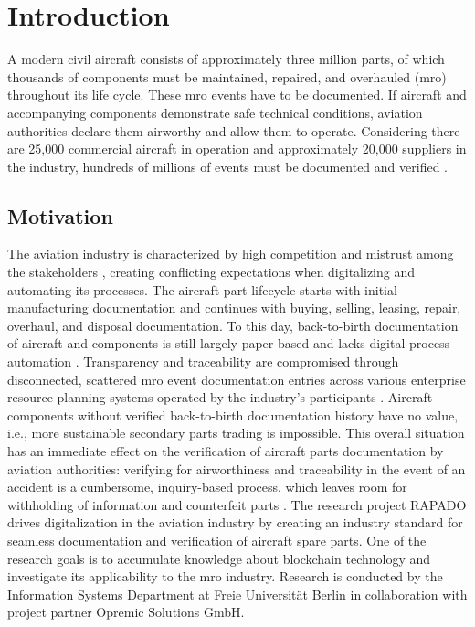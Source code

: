 \chapter{Introduction}
A modern civil aircraft consists of approximately three million parts, of which thousands of components must be maintained, repaired, and overhauled (\acrshort{mro}) throughout its life cycle. These \acrshort{mro} events have to be documented. If aircraft and accompanying components demonstrate safe technical conditions, aviation authorities declare them airworthy and allow them to operate. Considering there are 25,000 commercial aircraft in operation and approximately 20,000 suppliers in the industry, hundreds of millions of events must be documented and verified \citep{mroBCservices1}.
\section{Motivation}
The aviation industry is characterized by high competition and mistrust among the stakeholders \citep{Chatzi2019TDoC}, creating conflicting expectations when digitalizing and automating its processes. The aircraft part lifecycle starts with initial manufacturing documentation and continues with buying, selling, leasing, repair, overhaul, and disposal documentation. To this day, back-to-birth documentation of aircraft and components is still largely paper-based and lacks digital process automation \citep{efthymiou}. Transparency and traceability are compromised through disconnected, scattered \acrshort{mro} event documentation entries across various enterprise resource planning systems operated by the industry's participants \citep{mroBCservices1}. Aircraft components without verified back-to-birth documentation history have no value, i.e., more sustainable secondary parts trading is impossible. This overall situation has an immediate effect on the verification of aircraft parts documentation by aviation authorities: verifying for airworthiness and traceability in the event of an accident is a cumbersome, inquiry-based process, which leaves room for withholding of information and counterfeit parts \citep{planecrash}. 
The research project RAPADO drives digitalization in the aviation industry by creating an industry standard for seamless documentation and verification of aircraft spare parts. One of the research goals is to accumulate knowledge about blockchain technology and investigate its applicability to the \acrshort{mro} industry. Research is conducted by the Information Systems Department at Freie Universit{\"a}t Berlin in collaboration with project partner Opremic Solutions GmbH.

